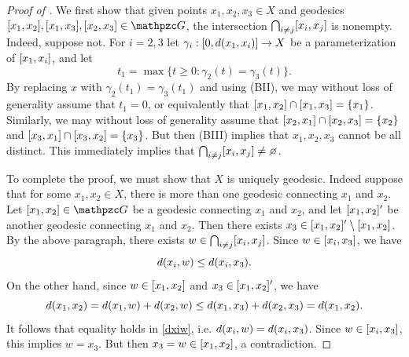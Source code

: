 \begin{proof}[Proof of  \implies {}]
We first show that given points $x_1,x_2,x_3\in X$ and geodesics $\geo{x_1}{x_2},\geo{x_1}{x_3},\geo{x_2}{x_3}\in\GG$, the intersection $\bigcap_{i\neq j} [x_i,x_j]$ is nonempty. Indeed, suppose not. For $i = 2,3$ let $\gamma_i:[0,d(x_1,x_i)]\to X$ be a parameterization of $[x_1,x_i]$, and let
\[
t_1 = \max\{t\geq 0 : \gamma_2(t) = \gamma_3(t)\}.
\]
By replacing $x$ with $\gamma_2(t_1) = \gamma_3(t_1)$ and using (BII), we may without loss of generality assume that $t_1 = 0$, or equivalently that $[x_1,x_2]\cap [x_1,x_3] = \{x_1\}$. Similarly, we may without loss of generality assume that $[x_2,x_1]\cap [x_2,x_3] = \{x_2\}$ and $[x_3,x_1]\cap[x_3,x_2] = \{x_3\}$. But then (BIII) implies that $x_1,x_2,x_3$ cannot be all distinct. This immediately implies that $\bigcap_{i\neq j} \geo{x_i}{x_j} \neq \emptyset$.

To complete the proof, we must show that $X$ is uniquely geodesic. Indeed suppose that for some $x_1,x_2\in X$, there is more than one geodesic connecting $x_1$ and $x_2$. Let $\geo{x_1}{x_2}\in\GG$ be a geodesic connecting $x_1$ and $x_2$, and let $[x_1,x_2]'$ be another geodesic connecting $x_1$ and $x_2$. Then there exists $x_3\in[x_1,x_2]'\setminus[x_1,x_2]$. By the above paragraph, there exists $w\in\bigcap_{i\neq j} [x_i,x_j]$. Since $w\in [x_i,x_3]$, we have
\begin{equation}
\label{dxiw}
d(x_i,w) \leq d(x_i,x_3).
\end{equation}
On the other hand, since $w\in [x_1,x_2]$ and $x_3\in[x_1,x_2]'$, we have
\[
d(x_1,x_2) = d(x_1,w) + d(x_2,w) \leq d(x_1,x_3) + d(x_2,x_3) = d(x_1,x_2).
\]
It follows that equality holds in \eqref{dxiw}, i.e. $d(x_i,w) = d(x_i,x_3)$. Since $w\in [x_i,x_3]$, this implies $w = x_3$. But then $x_3 = w\in [x_1,x_2]$, a contradiction.
\end{proof}


